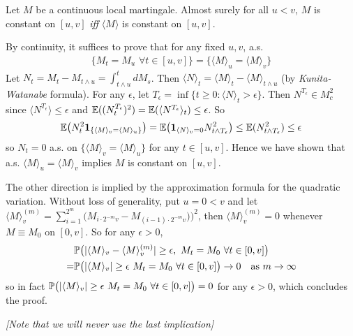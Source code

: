 \documentclass[12pt,a4paper]{article}
\newenvironment{proof}
{\begin{changemargin}{0.5cm}{0.5cm} 
	}%
	{\end{changemargin}
}
\newenvironment{p}
{\begin{proof} 
	}%
	{\end{proof}
}
\begin{document}
\lem Let $M$ be a continuous local martingale. Almost surely for all $u<v$, $M$ is constant on $[u,v]$ \emph{iff} $\langle M \rangle$ is constant on $[u,v]$.
\begin{p}
\pf By continuity, it suffices to prove that for any fixed $u, v$, a.s.
\begin{align*}
\{ M_t = M_u \,\, \forall t\in [u,v] \} = \{ \langle M \rangle_u = \langle M \rangle_v \}
\end{align*}
Let $N_t = M_t - M_{t\wedge u} = \int_{t\wedge u}^t dM_s$. Then $\langle N \rangle_t = \langle M \rangle_t - \langle M \rangle_{t\wedge u}$ (by \emph{Kunita-Watanabe} formula). For any $\epsilon$, let $T_{\epsilon} = \inf \{t\geq 0 : \langle N \rangle_t > \epsilon \}$. Then $N^{T_{\epsilon}} \in M_c^2$ since $\langle N^{T_{\epsilon}} \rangle \leq \epsilon$ and $\mathbb{E}((N_t^{T_{\epsilon}})^2) = \mathbb{E} (\langle N^{T_{\epsilon}} \rangle_{t}) \leq \epsilon$. So 
\begin{align*}
\mathbb{E} \big( N_t^2 \bm{1}_{\{\langle M \rangle_v =\langle M \rangle_u \}} \big) = \mathbb{E} \big( \bm{1}_{\langle N \rangle_v =0} N_{t\wedge T_{\epsilon}}^2 \big) \leq \mathbb{E} (N^2_{t\wedge T_{\epsilon}}) \leq \epsilon
\end{align*}
so $N_t =0$ a.s. on $\{\langle M \rangle_v = \langle M \rangle_u \}$ for any $t\in [u,v]$. Hence we have shown that a.s. $\langle M \rangle_u = \langle M \rangle_v$ implies $M$ is constant on $[u,v]$.
\s

The other direction is implied by the approximation formula for the quadratic variation. Without loss of generality, put $u=0 < v$ and let $\langle M \rangle^{(m)}_v = \sum_{i=1}^{2^m} \big( M_{i\cdot 2^{-m}v} - M_{(i-1)\cdot 2^{-m}v}) \big)^2$, then $\langle M \rangle^{(m)}_v =0$ whenever $M \equiv M_0$ on $[0,v]$. So for any $\epsilon>0$,
\begin{align*}
&\mathbb{P} \big(  | \langle M \rangle_v - \langle M \rangle_v^{(m)} | \geq \epsilon, \,\, M_t =M_0\,\, \forall t\in[0,v] \big) \\
=& \mathbb{P} \big( |\langle M \rangle_v| \geq \epsilon \,\, M_t =M_0\,\, \forall t\in[0,v] \big) \rightarrow 0 \quad \text{as } m \rightarrow \infty
\end{align*}
so in fact $\mathbb{P} \big( |\langle M \rangle_v| \geq \epsilon \,\, M_t =M_0\,\, \forall t\in[0,v] \big) =0$ for any $\epsilon >0$, which concludes the proof.
 
\emph{[Note that we will never use the last implication]}

\eop
\end{p}
\end{document}
